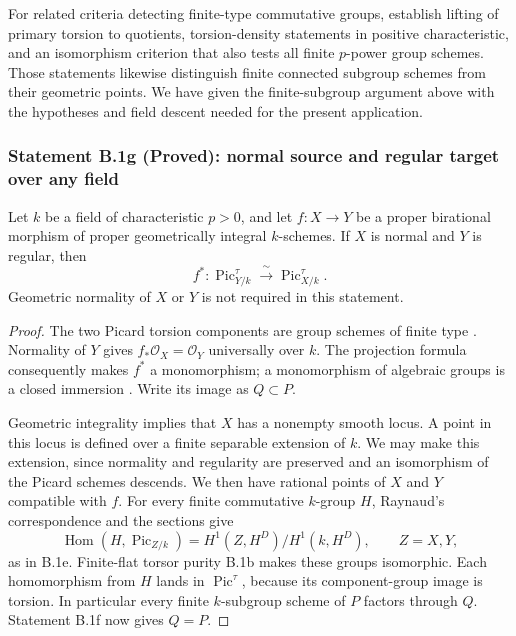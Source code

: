 \begin{remark}
For related criteria detecting finite-type commutative groups,
\cite[Lemmas 3.4.1--3.4.3, pp.~14--16 of the arXiv version]
{CotnerZavyalov2024B} establish lifting of primary torsion to
quotients, torsion-density statements in positive characteristic,
and an isomorphism criterion that also tests all finite $p$-power
group schemes.  Those statements likewise distinguish finite
connected subgroup schemes from their geometric points.  We have
given the finite-subgroup argument above with the hypotheses and
field descent needed for the present application.
\end{remark}

\subsubsection*{Statement B.1g (Proved): normal source and regular target over any field}
Let $k$ be a field of characteristic $p>0$, and let $f:X\to Y$ be a
proper birational morphism of proper geometrically integral
$k$-schemes.  If $X$ is normal and $Y$ is regular, then
\[
 f^*:\operatorname{Pic}^{\tau}_{Y/k}
       \xrightarrow{\ \sim\ }\operatorname{Pic}^{\tau}_{X/k}.
\]
Geometric normality of $X$ or $Y$ is not required in this statement.
\begin{proof}
The two Picard torsion components are group schemes of finite type
\cite[Corollary 4.18.3, Proposition 6.12 and Remarks 6.14 and 6.19]{Kleiman2005}.
Normality of $Y$ gives $f_*\mathcal O_X=\mathcal O_Y$ universally over
$k$.  The projection formula consequently makes $f^*$ a monomorphism;
a monomorphism of algebraic groups is a closed immersion
\cite[Theorem 5.34]{MilneAG2022B}.  Write its image as $Q\subset P$.

Geometric integrality implies that $X$ has a nonempty smooth locus.
A point in this locus is defined over a finite separable extension
of $k$.  We may make this extension, since normality and regularity
are preserved and an isomorphism of the Picard schemes descends.
We then have rational points of $X$ and $Y$ compatible with $f$.
For every finite commutative $k$-group $H$, Raynaud's correspondence
and the sections give
\[
 \operatorname{Hom}(H,\operatorname{Pic}_{Z/k})
   =H^1(Z,H^D)/H^1(k,H^D),\qquad Z=X,Y,
\]
as in B.1e.  Finite-flat torsor purity B.1b makes these groups
isomorphic.  Each homomorphism from $H$ lands in $\operatorname{Pic}^
{\tau}$, because its component-group image is torsion.  In particular
every finite $k$-subgroup scheme of $P$ factors through $Q$.
Statement B.1f now gives $Q=P$.
\end{proof}


